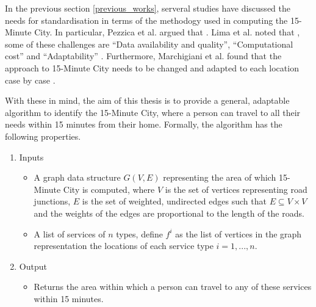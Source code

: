 In the previous section \ref{previous_works}, serveral studies have discussed the needs for standardisation in terms of the methodogy used in computing the 15-Minute City. In particular, Pezzica et al. argued that  \cite{Pezzica_Altafini_Mara_Chioni_2024}. Lima et al. noted that , some of these challenges are “Data availability and quality”, “Computational cost” and “Adaptability” \cite{lima_quest_2023}. Furthermore, Marchigiani et al. found that the approach to 15-Minute City needs to be changed and adapted to each location case by case \cite{marchigiani_urban_2022}.

With these in mind, the aim of this thesis is to provide a general, adaptable algorithm to identify the 15-Minute City, where a person can travel to all their needs within 15 minutes from their home. Formally, the algorithm has the following properties.

\begin{enumerate}
    \item Inputs
    \begin{itemize}
        \item A graph data structure $G(V,E)$ representing the area of which 15-Minute City is computed, where $V$ is the set of vertices representing road junctions, $E$ is the set of weighted, undirected edges such that $E\subseteq V\times V$ and the weights of the edges are proportional to the length of the roads.
        \item A list of services of $n$ types, define $f^i$ as the list of vertices in the graph representation the locations of each service type $i=1,...,n$.
    \end{itemize}
    \item Output
    \begin{itemize}
        \item Returns the area within which a person can travel to any of these services within 15 minutes.
    \end{itemize}
\end{enumerate}
